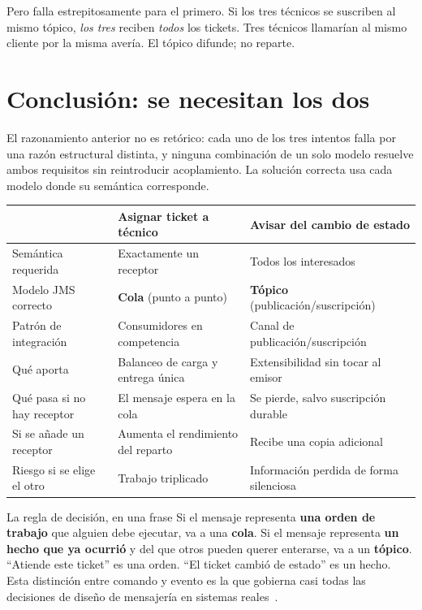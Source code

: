 \documentclass[11pt,a4paper]{book}
\begin{document}
Pero falla estrepitosamente para el primero.
Si los tres técnicos se suscriben al mismo tópico, \emph{los tres} reciben \emph{todos} los tickets.
Tres técnicos llamarían al mismo cliente por la misma avería.
El tópico difunde; no reparte.

\section{Conclusión: se necesitan los dos}

El razonamiento anterior no es retórico: cada uno de los tres intentos falla por una razón estructural distinta, y ninguna combinación de un solo modelo resuelve ambos requisitos sin reintroducir acoplamiento.
La solución correcta usa cada modelo donde su semántica corresponde.

\begin{center}
	\small
	\begin{tabularx}{\textwidth}{@{}p{4.2cm}XX@{}}
		\toprule
		& \textbf{Asignar ticket a técnico} & \textbf{Avisar del cambio de estado} \\
		\midrule
		Semántica requerida         & Exactamente un receptor           & Todos los interesados \\
		Modelo JMS correcto         & \textbf{Cola} (punto a punto)     & \textbf{Tópico} (publicación/suscripción) \\
		Patrón de integración       & Consumidores en competencia       & Canal de publicación/suscripción \\
		Qué aporta                  & Balanceo de carga y entrega única & Extensibilidad sin tocar al emisor \\
		Qué pasa si no hay receptor & El mensaje espera en la cola      & Se pierde, salvo suscripción durable \\
		Si se añade un receptor     & Aumenta el rendimiento del reparto & Recibe una copia adicional \\
		Riesgo si se elige el otro  & Trabajo triplicado                & Información perdida de forma silenciosa \\
		\bottomrule
	\end{tabularx}
\end{center}

\begin{cajaNota}{La regla de decisión, en una frase}
	Si el mensaje representa \textbf{una orden de trabajo} que alguien debe ejecutar, va a una \textbf{cola}.
	Si el mensaje representa \textbf{un hecho que ya ocurrió} y del que otros pueden querer enterarse, va a un \textbf{tópico}.
	``Atiende este ticket'' es una orden. ``El ticket cambió de estado'' es un hecho.
	Esta distinción entre comando y evento es la que gobierna casi todas las decisiones de diseño de mensajería en sistemas reales~\cite{newman2021microservices}.
\end{cajaNota}
\end{document}
